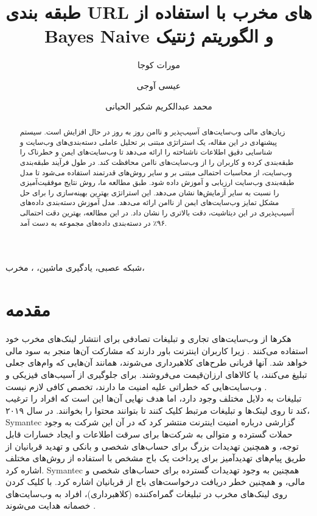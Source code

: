 \documentclass{CSICC2020}
\title{
	طبقه بندی URL های مخرب با استفاده از Bayes Naive و الگوریتم ژنتیک
}
\date{}
\author[1]{مورات کوجا}
\author[2]{عیسی آوجی}
\author[2]{محمد عبدالکریم شکیر الحیانی }
\affil[1]{
	 دانشگاه ییل یوزونجو وان، دانشکده مهندسی کامپیوتر
}
\affil[2]{
	دانشگاه کارابوک، دانشکده مهندسی کامپیوتر 
}
\begin{document}
	\maketitle
	\begin{abstract}
		زیان‌های مالی وب‌سایت‌های آسیب‌پذیر و ناامن روز به روز در حال افزایش است. سیستم پیشنهادی در این مقاله، یک استراتژی‌ مبتنی بر تحلیل عاملی دسته‌بندی‌های وب‌سایت‌ و شناسایی دقیق اطلاعات ناشناخته را ارائه می‌دهد تا وب‌سایت‌های ایمن و خطرناک را طبقه‌بندی کرده و کاربران را از وب‌سایت‌های ناامن محافظت کند. در طول فرآیند طبقه‌بندی وب‌سایت، از محاسبات احتمالی مبتنی بر  و سایر روش‌های قدرتمند استفاده می‌شود تا مدل طبقه‌بندی وب‌سایت ارزیابی و آموزش داده شود. طبق مطالعه ما، روش  نتایج موفقیت‌آمیزی را نسبت به سایر آزمایش‌ها نشان می‌دهد. این استراتژی بهترین بهینه‌سازی را برای حل مشکل تمایز وب‌سایت‌های ایمن از ناامن ارائه می‌دهد. مدل آموزش دسته‌بندی داده‌های آسیب‌پذیری در این دیتاشیت، دقت بالاتری را نشان داد. در این مطالعه، بهترین دقت احتمالی ۹۶٪ در دسته‌بندی داده‌های مجموعه   به دست آمد.
	\end{abstract}
	\begin{keywords}
		شبکه عصبی، یادگیری ماشین، ، مخرب،   
	\end{keywords}
	
	\section{مقدمه}
	\label{sec:introduction}
	
	هکرها از وب‌سایت‌های تجاری و تبلیغات تصادفی برای انتشار لینک‌های مخرب خود استفاده می‌کنند \cite{tavallaee2009detailed}. زیرا کاربران اینترنت باور دارند که مشارکت آن‌ها منجر به سود مالی خواهد شد. آنها قربانی طرح‌های کلاهبرداری می‌شوند، همانند آن‌هایی که وام‌های جعلی تبلیغ می‌کنند، یا کالاهای ارزان‌قیمت می‌فروشند. برای جلوگیری از آسیب‌های فیزیکی و  وب‌سایت‌هایی که خطراتی علیه امنیت ما دارند، تخصص کافی لازم نیست \cite{sharma2020malicious}.\\
	
	تبلیغات به دلایل مختلف وجود دارد، اما هدف نهایی آن‌ها این است که افراد را ترغیب کند تا روی لینک‌ها و تبلیغات مرتبط کلیک کنند تا بتوانند محتوا را بخوانند. در سال ۲۰۱۹، Symantec گزارشی درباره امنیت اینترنت منتشر کرد که در آن این شرکت به وجود حملات گسترده و متوالی به شرکت‌ها برای سرقت اطلاعات و ایجاد خسارات قابل توجه، و همچنین تهدیدات بزرگ برای حساب‌های شخصی و بانکی و تهدید قربانیان از طریق پیام‌های تهدیدآمیز برای پرداخت یک باج مشخص با استفاده از روش‌های مختلف اشاره کرد. Symantec همچنین به وجود تهدیدات گسترده برای حساب‌های شخصی و مالی، و همچنین خطر دریافت درخواست‌های باج از قربانیان اشاره کرد. با کلیک کردن روی لینک‌های مخرب در تبلیغات گمراه‌کننده (کلاهبرداری)، افراد به وب‌سایت‌های خصمانه هدایت می‌شوند \cite{santoshi2021twitter}.\\
	
\end{document}
